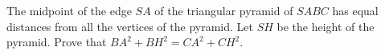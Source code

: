 The midpoint of the edge $SA$ of the triangular pyramid of $SABC$ has equal distances  from all the vertices of the pyramid. Let $SH$ be the height of the pyramid. Prove that $BA^2 + BH^2 = C A^2 + CH^2$.